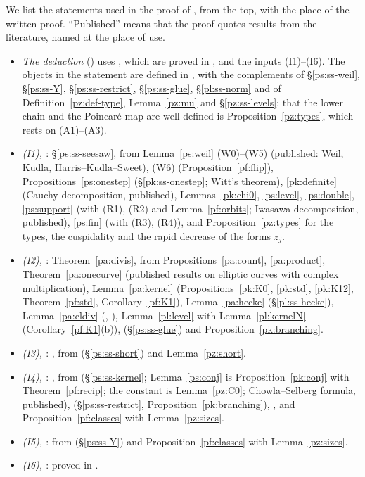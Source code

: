 \documentclass[10pt]{amsart}
\theoremstyle{definition}
\theoremstyle{remark}
\begin{document}
We list the statements used in the proof of {\cite[Theorem~14.13]{P46}}, from the top, with the place of
the written proof. ``Published'' means that the proof quotes results from the literature, named at
the place of use.
\begin{itemize}
\item \emph{The deduction} ({\cite[\S14.7]{P46}}) uses {\cite[Lemmas~14.9 and~14.18]{P46}},
which are proved in {\cite[\S14]{P46}}, and the inputs (I1)--(I6). The objects in the
statement are defined in {\cite[\S14.3]{P46}}, with the complements of \S\ref{ps:ss-weil},
\S\ref{ps:ss-Y}, \S\ref{ps:ss-restrict}, \S\ref{ps:ss-glue}, \S\ref{pl:ss-norm} and of
Definition~\ref{pz:def-type}, Lemma~\ref{pz:mu} and \S\ref{pz:ss-levels}; that the lower chain and
the Poincar\'e map are well defined is Proposition~\ref{pz:types}, which rests on (A1)--(A3).
\item \emph{{\rm(I1)}, {\cite[Proposition~14.19]{P46}}}: \S\ref{ps:ss-seesaw}, from
Lemma~\ref{ps:weil} (W0)--(W5) (published: Weil, Kudla, Harris--Kudla--Sweet), (W6)
(Proposition~\ref{pf:flip}), Propositions~\ref{ps:onestep} (\S\ref{pk:ss-onestep}; Witt's theorem),
\ref{pk:definite} (Cauchy decomposition, published), Lemmas~\ref{pk:chi0}, \ref{ps:level},
\ref{ps:double}, \ref{ps:support} (with (R1), (R2) and Lemma~\ref{pf:orbits}; Iwasawa decomposition,
published), \ref{ps:fin} (with (R3), (R4)), and Proposition~\ref{pz:types} for the types, the
cuspidality and the rapid decrease of the forms $z_j$.
\item \emph{{\rm(I2)}, {\cite[Proposition~14.20]{P46}}}: Theorem~\ref{pa:divis}, from
Propositions~\ref{pa:count}, \ref{pa:product}, Theorem~\ref{pa:onecurve} (published results on
elliptic curves with complex multiplication), Lemma~\ref{pa:kernel} (Propositions~\ref{pk:K0},
\ref{pk:std}, \ref{pk:K12}, Theorem~\ref{pf:std}, Corollary~\ref{pf:K1}), Lemma~\ref{pa:hecke}
(\S\ref{pl:ss-hecke}), Lemma~\ref{pa:eldiv} ({\cite[Theorem~2.2]{P50}}, {\cite[\S3]{P50}}),
Lemma~\ref{pl:level} with Lemma~\ref{pl:kernelN} (Corollary~\ref{pf:K1}(b)),
{\cite[Proposition~14.25]{P46}} (\S\ref{ps:ss-glue}) and Proposition~\ref{pk:branching}.
\item \emph{{\rm(I3)}, {\cite[Proposition~14.22]{P46}}}: {\cite[\S14.8]{P46}}, from
{\cite[Lemma~14.21]{P46}} (\S\ref{ps:ss-short}) and Lemma~\ref{pz:short}.
\item \emph{{\rm(I4)}, {\cite[Proposition~14.26]{P46}}}: {\cite[\S14.8]{P46}}, from
{\cite[Proposition~14.23]{P46}} (\S\ref{ps:ss-kernel}; Lemma~\ref{ps:conj} is Proposition~\ref{pk:conj}
with Theorem~\ref{pf:recip}; the constant is Lemma~\ref{pz:C0}; Chowla--Selberg formula,
published), {\cite[Proposition~14.24]{P46}} (\S\ref{ps:ss-restrict}, Proposition~\ref{pk:branching}),
{\cite[Proposition~14.25]{P46}}, and Proposition~\ref{pf:classes} with Lemma~\ref{pz:sizes}.
\item \emph{{\rm(I5)}, {\cite[Proposition~14.28]{P46}}}: from {\cite[Proposition~14.27]{P46}} (\S\ref{ps:ss-Y})
and Proposition~\ref{pf:classes} with Lemma~\ref{pz:sizes}.
\item \emph{{\rm(I6)}, {\cite[Lemma~14.29]{P46}}}: proved in {\cite[\S14.9]{P46}}.
\end{itemize}
\end{document}
